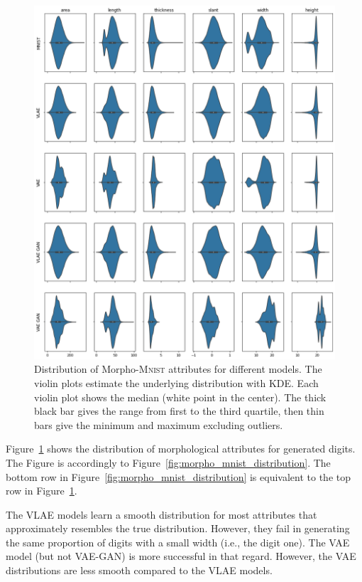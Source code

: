 \begin{figure}
    \centering
    \includegraphics[width=\textwidth]{images/generated_vs_true/mnist/morpho_distr.png}
    \caption[Distribution of Morpho-\textsc{Mnist} attributes for different models]{Distribution of Morpho-\textsc{Mnist} attributes for different models.
    The violin plots estimate the underlying distribution with \ac{KDE}.
    Each violin plot shows the median (white point in the center).
    The thick black bar gives the range from first to the third quartile, then thin bars give the minimum and maximum excluding outliers.}
    \label{fig:generated_morpho_distribution}
\end{figure}

Figure~\ref{fig:generated_morpho_distribution} shows the distribution of morphological attributes for generated digits.
The Figure is accordingly to Figure~\ref{fig:morpho_mnist_distribution}.
The bottom row in Figure~\ref{fig:morpho_mnist_distribution} is equivalent to the top row in Figure~\ref{fig:generated_morpho_distribution}.

The \ac{VLAE} models learn a smooth distribution for most attributes that approximately resembles the true distribution.
However, they fail in generating the same proportion of digits with a small width (i.e., the digit one).
The \ac{VAE} model (but not \ac{VAE}-\ac{GAN}) is more successful in that regard.
However, the \ac{VAE} distributions are less smooth compared to the \ac{VLAE} models.

